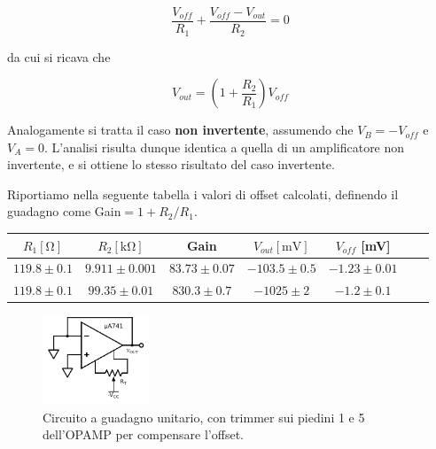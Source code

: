 $$\frac{V_{off}}{R_1} + \frac{V_{off}-V_{out}}{R_2} = 0$$

da cui si ricava che

$$V_{out}=\left(1+\frac{R_2}{R_1}\right) V_{off}$$

Analogamente si tratta il caso \textbf{non invertente}, assumendo che $V_B=-V_{off}$ e $V_A=0$. L'analisi risulta dunque identica a quella di un amplificatore non invertente, e si ottiene lo stesso risultato del caso invertente. 

Riportiamo nella seguente tabella i valori di offset calcolati, definendo il guadagno come Gain$=1+R_2/R_1$. 

\begin{center}
\begin{savenotes}
\begin{tabular}{c|c|c|c|c|c|c}
$R_1[\si{\ohm}]$ & $R_2[\si{\kilo\ohm}]$ & Gain &$V_{out} [\si{\milli\volt}]$ & $V_{off}$ [\si{\milli\volt}]\\ 
\hline 
$119.8\pm0.1$ & $9.911\pm0.001$ & $83.73\pm0.07$&  $-103.5 \pm 0.5$ & $-1.23 \pm0.01$\\
\hline
$119.8\pm0.1$ & $99.35\pm0.01$ & $830.3\pm0.7$ &$ -1025 \pm 2$ & $-1.2 \pm0.1$\\

\end{tabular}
\end{savenotes}
\end{center}

\begin{figure}
  \begin{center}
    \includegraphics[width=0.280\textwidth]{../E02/latex/trimmer_correction.pdf}
  \end{center}
  \caption{Circuito a guadagno unitario, con trimmer sui piedini 1 e 5 dell'OPAMP per compensare l'offset.}
  \label{cir2:trimmer}
\end{figure}

